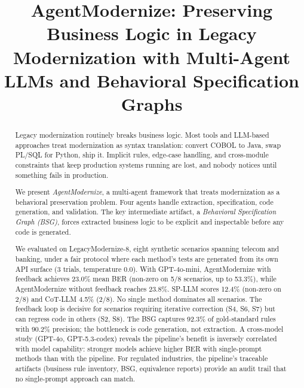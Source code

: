 \documentclass[conference]{IEEEtran}
\begin{document}
\title{AgentModernize: Preserving Business Logic in Legacy Modernization with Multi-Agent LLMs and Behavioral Specification Graphs}

\author{
}

\maketitle

\begin{abstract}
Legacy modernization routinely breaks business logic. Most tools and LLM-based approaches treat modernization as syntax translation: convert COBOL to Java, swap PL/SQL for Python, ship it. Implicit rules, edge-case handling, and cross-module constraints that keep production systems running are lost, and nobody notices until something fails in production.

We present \textit{AgentModernize}, a multi-agent framework that treats modernization as a behavioral preservation problem. Four agents handle extraction, specification, code generation, and validation. The key intermediate artifact, a \textit{Behavioral Specification Graph (BSG)}, forces extracted business logic to be explicit and inspectable before any code is generated.

We evaluated on LegacyModernize-8, eight synthetic scenarios spanning telecom and banking, under a fair protocol where each method's tests are generated from its own API surface (3 trials, temperature 0.0). With GPT-4o-mini, AgentModernize with feedback achieves 23.0\% mean BER (non-zero on 5/8 scenarios, up to 53.3\%), while AgentModernize without feedback reaches 23.8\%. SP-LLM scores 12.4\% (non-zero on 2/8) and CoT-LLM 4.5\% (2/8). No single method dominates all scenarios. The feedback loop is decisive for scenarios requiring iterative correction (S4, S6, S7) but can regress code in others (S2, S8). The BSG captures 92.3\% of gold-standard rules with 90.2\% precision; the bottleneck is code generation, not extraction. A cross-model study (GPT-4o, GPT-5.3-codex) reveals the pipeline's benefit is inversely correlated with model capability: stronger models achieve higher BER with single-prompt methods than with the pipeline. For regulated industries, the pipeline's traceable artifacts (business rule inventory, BSG, equivalence reports) provide an audit trail that no single-prompt approach can match.
\end{abstract}
\end{document}
